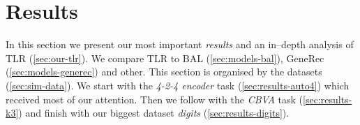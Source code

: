 

\section{Results} 
\label{sec:results} 

In this section we present our most important \emph{results} and an in--depth analysis of TLR (\ref{sec:our-tlr}). We compare TLR to BAL (\ref{sec:models-bal}), GeneRec (\ref{sec:models-generec}) and other. This section is organised by the datasets (\ref{sec:sim-data}). We start with the \emph{4-2-4 encoder} task (\ref{sec:results-auto4}) which received most of our attention. Then we follow with the \emph{CBVA} task (\ref{sec:results-k3}) and finish with our biggest dataset \emph{digits} (\ref{sec:results-digits}). 

 

 

 

 

